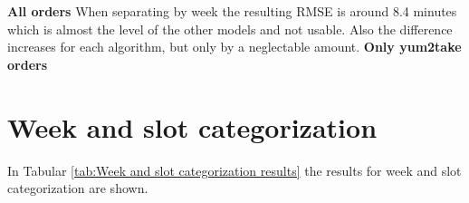 \newline\newline\textbf{All orders}\newline
When separating by week the resulting RMSE is around 8.4 minutes which is almost the level of the other models and not usable. Also the difference increases for each algorithm, but only by a neglectable amount.
\newline\newline\textbf{Only yum2take orders}\newline
\section{Week and slot categorization}\label{section:Week and slot categorization}
In Tabular \ref{tab:Week and slot categorization results} the results for week and slot categorization are shown.
\begin{table}[h]
\centering
\caption{Week and slot categorization results}
\label{tab:Week and slot categorization results}
\end{table}
